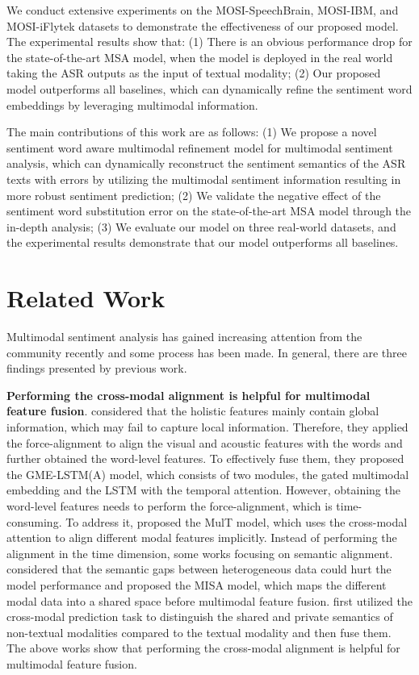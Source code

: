 \documentclass[11pt]{article}
\begin{document}
We conduct extensive experiments on the MOSI-SpeechBrain, MOSI-IBM, and MOSI-iFlytek datasets to demonstrate the effectiveness of our proposed model. The experimental results show that: (1) There is an obvious performance drop for the state-of-the-art MSA model, when the model is deployed in the real world taking the ASR outputs as the input of textual modality; (2) Our proposed model outperforms all baselines, which can dynamically refine the sentiment word embeddings by leveraging multimodal information.

The main contributions of this work are as follows: (1) We propose a novel sentiment word aware multimodal refinement model for multimodal sentiment analysis, which can dynamically reconstruct the sentiment semantics of the ASR texts with errors by utilizing the multimodal sentiment information resulting in more robust sentiment prediction; (2) We validate the negative effect of the sentiment word substitution error on the state-of-the-art MSA model through the in-depth analysis; (3) We evaluate our model on three real-world datasets, and the experimental results demonstrate that our model outperforms all baselines.


\section{Related Work}

Multimodal sentiment analysis has gained increasing attention from the community recently and some process has been made. In general, there are three findings presented by previous work. 

\textbf{Performing the cross-modal alignment is helpful for multimodal feature fusion}. \citet{10.1145/3136755.3136801} considered that the holistic features mainly contain global information, which may fail to capture local information. Therefore, they applied the force-alignment to align the visual and acoustic features with the words and further obtained the word-level features. To effectively fuse them, they proposed the GME-LSTM(A) model, which consists of two modules, the gated multimodal embedding and the LSTM with the temporal attention. However, obtaining the word-level features needs to perform the force-alignment, which is time-consuming. To address it, \citet{tsai-etal-2019-multimodal} proposed the MulT model, which uses the cross-modal attention to align different modal features implicitly. Instead of performing the alignment in the time dimension, some works focusing on semantic alignment. \citet{10.1145/3394171.3413678} considered that the semantic gaps between heterogeneous data could hurt the model performance and proposed the MISA model, which maps the different modal data into a shared space before multimodal feature fusion. \citet{wu-etal-2021-text} first utilized the cross-modal prediction task to distinguish the shared and private semantics of non-textual modalities compared to the textual modality and then fuse them. The above works show that performing the cross-modal alignment is helpful for multimodal feature fusion.
\end{document}
